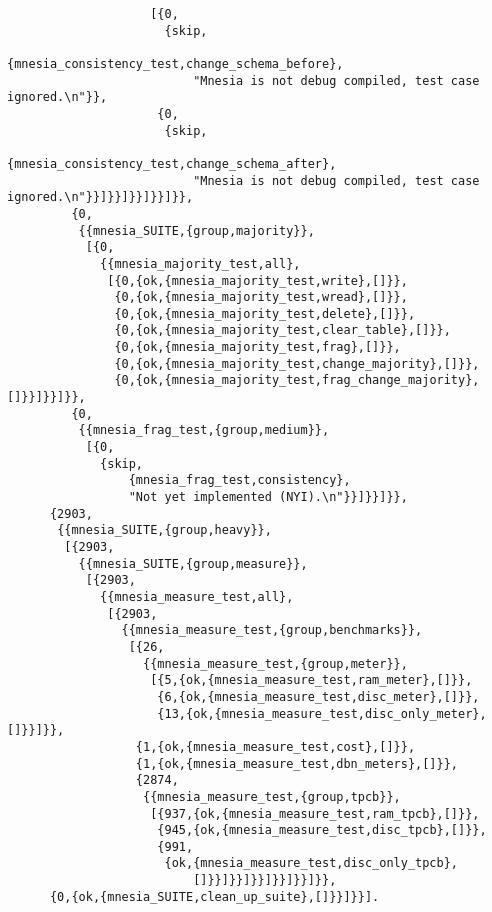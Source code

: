 \begin{verbatim}
                    [{0,
                      {skip,
                          {mnesia_consistency_test,change_schema_before},
                          "Mnesia is not debug compiled, test case ignored.\n"}},
                     {0,
                      {skip,
                          {mnesia_consistency_test,change_schema_after},
                          "Mnesia is not debug compiled, test case ignored.\n"}}]}}]}}]}}]}},
         {0,
          {{mnesia_SUITE,{group,majority}},
           [{0,
             {{mnesia_majority_test,all},
              [{0,{ok,{mnesia_majority_test,write},[]}},
               {0,{ok,{mnesia_majority_test,wread},[]}},
               {0,{ok,{mnesia_majority_test,delete},[]}},
               {0,{ok,{mnesia_majority_test,clear_table},[]}},
               {0,{ok,{mnesia_majority_test,frag},[]}},
               {0,{ok,{mnesia_majority_test,change_majority},[]}},
               {0,{ok,{mnesia_majority_test,frag_change_majority},[]}}]}}]}},
         {0,
          {{mnesia_frag_test,{group,medium}},
           [{0,
             {skip,
                 {mnesia_frag_test,consistency},
                 "Not yet implemented (NYI).\n"}}]}}]}},
      {2903,
       {{mnesia_SUITE,{group,heavy}},
        [{2903,
          {{mnesia_SUITE,{group,measure}},
           [{2903,
             {{mnesia_measure_test,all},
              [{2903,
                {{mnesia_measure_test,{group,benchmarks}},
                 [{26,
                   {{mnesia_measure_test,{group,meter}},
                    [{5,{ok,{mnesia_measure_test,ram_meter},[]}},
                     {6,{ok,{mnesia_measure_test,disc_meter},[]}},
                     {13,{ok,{mnesia_measure_test,disc_only_meter},[]}}]}},
                  {1,{ok,{mnesia_measure_test,cost},[]}},
                  {1,{ok,{mnesia_measure_test,dbn_meters},[]}},
                  {2874,
                   {{mnesia_measure_test,{group,tpcb}},
                    [{937,{ok,{mnesia_measure_test,ram_tpcb},[]}},
                     {945,{ok,{mnesia_measure_test,disc_tpcb},[]}},
                     {991,
                      {ok,{mnesia_measure_test,disc_only_tpcb},
                          []}}]}}]}}]}}]}}]}},
      {0,{ok,{mnesia_SUITE,clean_up_suite},[]}}]}}].
   
\end{verbatim}
